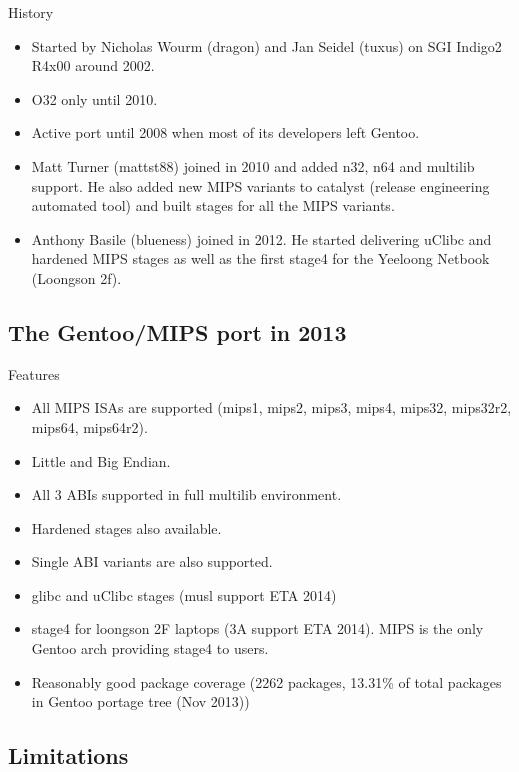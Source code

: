 \documentclass{beamer}
\begin{document}
\begin{frame}{History}
	\begin{itemize}
		\item Started by Nicholas Wourm (dragon) and Jan Seidel (tuxus) on SGI Indigo2 R4x00 around 2002.
		\item O32 only until 2010.
		\item Active port until 2008 when most of its developers left Gentoo.
		\item Matt Turner (mattst88) joined in 2010 and added n32, n64 and multilib support. He also added new MIPS variants to catalyst (release engineering automated tool) and built stages for all the MIPS
	variants.
		\item Anthony Basile (blueness) joined in 2012. He started delivering uClibc and hardened MIPS stages as well as the first stage4 for the Yeeloong Netbook (Loongson 2f).
	\end{itemize}
\end{frame}

\subsection{The Gentoo/MIPS port in 2013}

\begin{frame}{Features}
	\begin{itemize}
		\item All MIPS ISAs are supported (mips1, mips2, mips3, mips4, mips32, mips32r2, mips64, mips64r2).
		\item Little and Big Endian.
		\item All 3 ABIs supported in full multilib environment.
		\item Hardened stages also available.
		\item Single ABI variants are also supported.
		\item glibc and uClibc stages (musl support ETA 2014)
		\item stage4 for loongson 2F laptops (3A support ETA 2014). MIPS is the only Gentoo arch providing stage4 to users.
		\item Reasonably good package coverage (2262 packages, 13.31\% of total packages in Gentoo portage tree (Nov 2013))
	\end{itemize}
\end{frame}

\subsection{Limitations}
\end{document}
